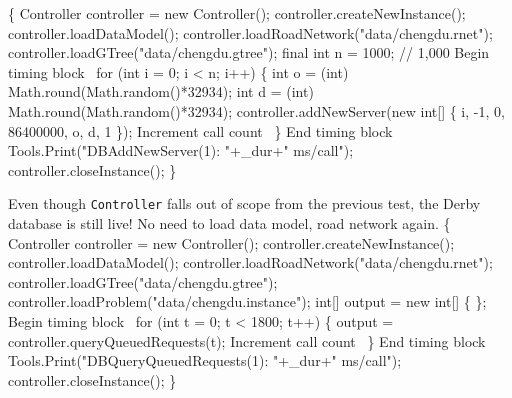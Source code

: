 \documentclass{article}
\def\nwendcode{\endtrivlist \endgroup}
\let\nwdocspar=\par
\begin{document}
\nwenddocs{}\endmoddef{}
\{
  Controller controller = new Controller();
  controller.createNewInstance();
  controller.loadDataModel();
  controller.loadRoadNetwork("data/chengdu.rnet");
  controller.loadGTree("data/chengdu.gtree");
  final int n = 1000;  // 1,000
  \LA{}Begin timing block~{\nwtagstyle{}}\RA{}
  for (int i = 0; i < n; i++) \{
    int o = (int) Math.round(Math.random()*32934);
    int d = (int) Math.round(Math.random()*32934);
    controller.addNewServer(new int[] \{ i, -1, 0, 86400000, o, d, 1 \});
    \LA{}Increment call count~{\nwtagstyle{}}\RA{}
  \}
  \LA{}End timing block~{\nwtagstyle{}}\RA{}
  Tools.Print("DBAddNewServer(1): "+_dur+" ms/call");
  controller.closeInstance();
\}
\nwendcode{}\nwdocspar

Even though {\tt{}Controller} falls out of scope from the previous test,
the Derby database is still live! No need to load data model, road network
again.
\nwenddocs{}\endmoddef{}
\{
  Controller controller = new Controller();
  controller.createNewInstance();
  controller.loadDataModel();
  controller.loadRoadNetwork("data/chengdu.rnet");
  controller.loadGTree("data/chengdu.gtree");
  controller.loadProblem("data/chengdu.instance");
  int[] output = new int[] \{ \};
  \LA{}Begin timing block~{\nwtagstyle{}}\RA{}
  for (int t = 0; t < 1800; t++) \{
    output = controller.queryQueuedRequests(t);
    \LA{}Increment call count~{\nwtagstyle{}}\RA{}
  \}
  \LA{}End timing block~{\nwtagstyle{}}\RA{}
  Tools.Print("DBQueryQueuedRequests(1): "+_dur+" ms/call");
  controller.closeInstance();
\}
\nwendcode{}\nwdocspar
\end{document}
